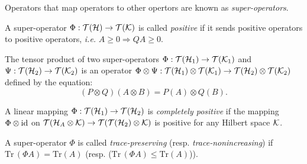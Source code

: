 

\begin{definition}
 Operators that map operators to other opertors are known as \emph{super-operators}. 
\end{definition}


\begin{definition} \label{def:positive_superoperator}
  A super-operator $\Phi: \mathcal{T}(\mathcal{H}) \to \mathcal{T}(\mathcal{K}) $ is called \emph{positive} if it sends positive operators to positive operators, \textit{i.e.} $A \geq 0 \Rightarrow{} Q A \geq 0$.
\end{definition}

\begin{definition}
  The tensor product of two super-operators $\Phi: \mathcal{T}(\mathcal{H}_1) \rightarrow \mathcal{T}(\mathcal{K}_1) $ and $\Psi : \mathcal{T}(\mathcal{H}_2) \rightarrow \mathcal{T}(\mathcal{K}_2)$ is an operator $ \Phi \otimes \Psi:  \mathcal{T}(\mathcal{H}_1) \otimes \mathcal{T}(\mathcal{K}_1) \rightarrow \mathcal{T}(\mathcal{H}_2) \otimes \mathcal{T}(\mathcal{K}_2)$ defined by the equation:
\begin{equation*}
  (P \otimes Q)(A \otimes B) = P (A) \otimes Q(B).
\end{equation*}
\end{definition}

\begin{definition} \label{def:completely_positive_superoperator}
  A linear mapping $ \Phi : \mathcal{T}(\mathcal{H}_1) \to \mathcal{T}(\mathcal{H}_2)$ is \emph{completely positive} if the mapping 
$\Phi \otimes \mathrm{id}$ on $\mathcal{T}(\mathcal{H}_A \otimes \mathcal{K}) \to \mathcal{T}(\mathcal{T}(\mathcal{H}_2)\otimes \mathcal{K}) $ is positive for any Hilbert space $\mathcal{K}$.
\end{definition}

\begin{definition} \label{def:trace_preserving_superoperator}
  A super-operator $\Phi$ is called \emph{trace-preserving} (resp. \emph{trace-nonincreasing}) if $\text{Tr} \hspace{2pt} (\Phi A)= \text{Tr} (A) $ (resp. ($\text{Tr} \hspace{2pt} (\Phi A)\leq \text{Tr} (A)$)).
\end{definition}

